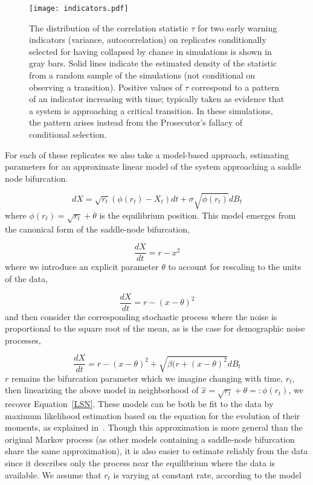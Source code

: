 \documentclass[authoryear,review,12pt]{elsarticle}
\begin{document}
\begin{figure}
  \begin{center}
    \texttt{[image: indicators.pdf]}
  \end{center}
  \caption{The distribution of the correlation statistic $\tau$ for two
  early warning indicators (variance, autocorrelation) on replicates
  conditionally selected for having collapsed by chance in simulations
  is shown in gray bars.  Solid lines indicate the estimated density of
  the statistic from a random sample of the simulations (not conditional
  on observing a transition). Positive values of $\tau$ correspond to
  a pattern of an indicator increasing with time; typically taken as
  evidence that a system is approaching a critical transition.  In these
  simulations, the pattern arises instead from the Prosecutor's fallacy
  of conditional selection.}
  \label{fig:indicator}
\end{figure}




For each of these replicates we also take a model-based approach, estimating 
parameters for an approximate linear model of the system approaching a
saddle node bifurcation.


\begin{equation}
  dX = \sqrt{ r_t } (\phi(r_t) - X_t) dt +
  \sigma\sqrt{\phi(r_t) } d B_t \label{LSN}
\end{equation}
where \( \phi(r_t) = \sqrt{r_t} +\theta \) is the equilibrium position.  
This model emerges from the canonical form of the saddle-node bifurcation,

\begin{equation}
  \frac{dX}{dt} = r - x^2
\end{equation}
where we introduce an explicit parameter $\theta$ to account for rescaling
to the units of the data,

\begin{equation}
   \frac{dX}{dt} = r - (x-\theta)^2
\end{equation}
and then consider the corresponding stochastic process where the noise is
proportional to the square root of the mean, as is the case for demographic
noise processes,

\begin{equation}
  \frac{dX}{dt} = r - (x-\theta)^2 + \sqrt{ \beta (r + (x-\theta)^2 } dB_t
\end{equation}
$r$ remains the bifurcation parameter which we imagine changing with time,
$r_t$, then linearizing the above model in neighborhood of
\(\hat x = \sqrt{r_t} +\theta =: \phi(r_t)\), we recover Equation~\eqref{LSN}.
These models can be both be fit to the data by maximum likelihood estimation
based on the equation for the evolution of their moments, as explained
in~\citet{Boettiger2012b}.  Though this approximation is more general than 
the original Markov process (as other models containing a saddle-node bifurcation
share the same approximation), it is also easier to estimate reliably from 
the data since it describes only the process near the equilibrium where the
data is available.  We assume that $r_t$ is varying at constant rate, 
according to the model
\end{document}
